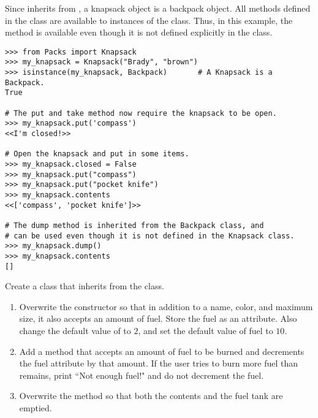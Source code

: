 Since  inherits from , a knapsack object is a backpack object.
All methods defined in the  class are available to instances of the  class.
Thus, in this example, the  method is available even though it is not defined explicitly in the  class.

\begin{lstlisting}
>>> from Packs import Knapsack
>>> my_knapsack = Knapsack("Brady", "brown")
>>> isinstance(my_knapsack, Backpack)       # A Knapsack is a Backpack.
True

# The put and take method now require the knapsack to be open.
>>> my_knapsack.put('compass')
<<I'm closed!>>

# Open the knapsack and put in some items.
>>> my_knapsack.closed = False
>>> my_knapsack.put("compass")
>>> my_knapsack.put("pocket knife")
>>> my_knapsack.contents
<<['compass', 'pocket knife']>>

# The dump method is inherited from the Backpack class, and
# can be used even though it is not defined in the Knapsack class.
>>> my_knapsack.dump()
>>> my_knapsack.contents
[]
\end{lstlisting}

\begin{problem}
Create a  class that inherits from the  class.
\begin{enumerate}
\item Overwrite the constructor so that in addition to a name, color, and maximum size, it also accepts an amount of fuel.
Store the fuel as an attribute.
Also change the default value of  to $2$, and set the default value of fuel to $10$.

\item Add a  method that accepts an amount of fuel to be burned and decrements the fuel attribute by that amount.
If the user tries to burn more fuel than remains, print ``Not enough fuel!" and do not decrement the fuel.

\item Overwrite the  method so that both the contents and the fuel tank are emptied.
\end{enumerate}
\end{problem}


